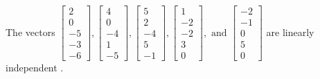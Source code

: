 \begin{exercise}
\begin{exerciseStatement}
  \end{exerciseStatement}
  \begin{exerciseAnswer}
   The vectors \(\left[\begin{array}{r}
2 \\
0 \\
-5 \\
-3 \\
-6
\end{array}\right] , \left[\begin{array}{r}
4 \\
0 \\
-4 \\
1 \\
-5
\end{array}\right] , \left[\begin{array}{r}
5 \\
2 \\
-4 \\
5 \\
-1
\end{array}\right] , \left[\begin{array}{r}
1 \\
-2 \\
-2 \\
3 \\
0
\end{array}\right] , \text{ and } \left[\begin{array}{r}
-2 \\
-1 \\
0 \\
5 \\
0
\end{array}\right]\) are 
  	 linearly independent  .
  


  \end{exerciseAnswer}
\end{exercise}